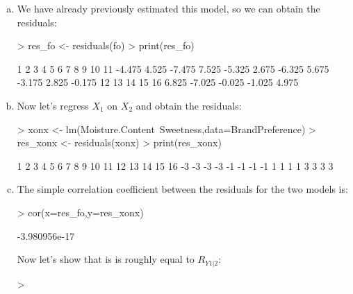\documentclass{article}
\begin{document}
\begin{enumerate}[a)]
\item{} We have already previously estimated this model, so we can obtain the residuals:

\begin{Schunk}
\begin{Sinput}
> res_fo <- residuals(fo)
> print(res_fo)
\end{Sinput}
\begin{Soutput}
     1      2      3      4      5      6      7      8      9     10     11 
-4.475  4.525 -7.475  7.525 -5.325  2.675 -6.325  5.675 -3.175  2.825 -0.175 
    12     13     14     15     16 
 6.825 -7.025 -0.025 -1.025  4.975 
\end{Soutput}
\end{Schunk}

\item{} Now let's regress $X_1$ on $X_2$ and obtain the residuals:

\begin{Schunk}
\begin{Sinput}
> xonx <- lm(Moisture.Content~Sweetness,data=BrandPreference)
> res_xonx <- residuals(xonx)
> print(res_xonx)
\end{Sinput}
\begin{Soutput}
 1  2  3  4  5  6  7  8  9 10 11 12 13 14 15 16 
-3 -3 -3 -3 -1 -1 -1 -1  1  1  1  1  3  3  3  3 
\end{Soutput}
\end{Schunk}

\item{} The simple correlation coefficient between the residuals for the two models is:

\begin{Schunk}
\begin{Sinput}
> cor(x=res_fo,y=res_xonx)
\end{Sinput}
\begin{Soutput}
[1] -3.980956e-17
\end{Soutput}
\end{Schunk}

Now let's show that is is roughly equal to $R_{Y1|2}$:

\begin{Schunk}
\begin{Sinput}
> 
\end{Sinput}
\end{Schunk}

\end{enumerate}
\end{document}
